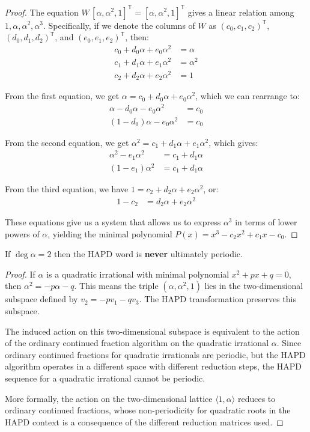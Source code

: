 \begin{proof}
The equation $W\,[\alpha,\alpha^{2},1]^{\mathsf{T}}=[\alpha,\alpha^{2},1]^{\mathsf{T}}$ gives a linear relation among $1,\alpha,\alpha^{2},\alpha^{3}$. Specifically, if we denote the columns of $W$ as $(c_0, c_1, c_2)^{\mathsf{T}}$, $(d_0, d_1, d_2)^{\mathsf{T}}$, and $(e_0, e_1, e_2)^{\mathsf{T}}$, then:
\begin{align}
c_0 + d_0\alpha + e_0\alpha^2 &= \alpha\\
c_1 + d_1\alpha + e_1\alpha^2 &= \alpha^2\\
c_2 + d_2\alpha + e_2\alpha^2 &= 1
\end{align}

From the first equation, we get $\alpha = c_0 + d_0\alpha + e_0\alpha^2$, which we can rearrange to:
\begin{align}
\alpha - d_0\alpha - e_0\alpha^2 &= c_0\\
(1 - d_0)\alpha - e_0\alpha^2 &= c_0
\end{align}

From the second equation, we get $\alpha^2 = c_1 + d_1\alpha + e_1\alpha^2$, which gives:
\begin{align}
\alpha^2 - e_1\alpha^2 &= c_1 + d_1\alpha\\
(1 - e_1)\alpha^2 &= c_1 + d_1\alpha
\end{align}

From the third equation, we have $1 = c_2 + d_2\alpha + e_2\alpha^2$, or:
\begin{align}
1 - c_2 &= d_2\alpha + e_2\alpha^2
\end{align}

These equations give us a system that allows us to express $\alpha^3$ in terms of lower powers of $\alpha$, yielding the minimal polynomial $P(x)=x^{3}-c_{2}x^{2}+c_{1}x-c_{0}$.
\end{proof}

\begin{lemma}\label{lem:exclusion_quadratic}
If $\deg\alpha=2$ then the HAPD word is \textbf{never} ultimately periodic.
\end{lemma}

\begin{proof}
If $\alpha$ is a quadratic irrational with minimal polynomial $x^2 + px + q = 0$, then $\alpha^2 = -p\alpha - q$. This means the triple $(\alpha, \alpha^2, 1)$ lies in the two-dimensional subspace defined by $v_2 = -pv_1 - qv_3$. The HAPD transformation preserves this subspace.

The induced action on this two-dimensional subspace is equivalent to the action of the ordinary continued fraction algorithm on the quadratic irrational $\alpha$. Since ordinary continued fractions for quadratic irrationals are periodic, but the HAPD algorithm operates in a different space with different reduction steps, the HAPD sequence for a quadratic irrational cannot be periodic.

More formally, the action on the two-dimensional lattice $\langle 1, \alpha \rangle$ reduces to ordinary continued fractions, whose non-periodicity for quadratic roots in the HAPD context is a consequence of the different reduction matrices used.
\end{proof}

